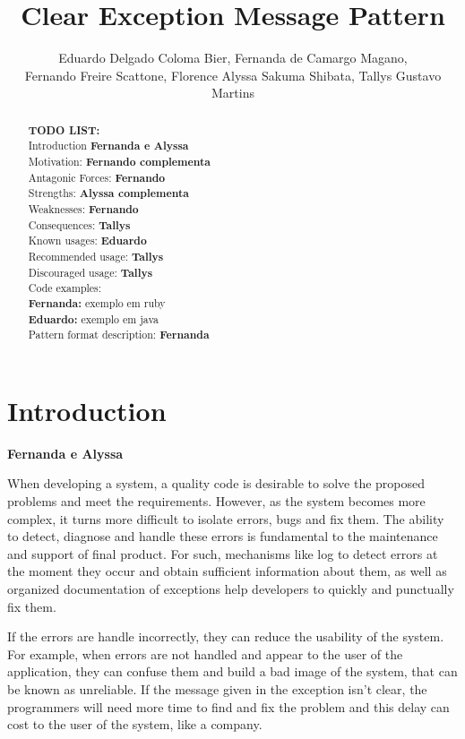\documentclass[12pt]{article}
\title{Clear Exception Message Pattern}
\author{Eduardo Delgado Coloma Bier\inst{1}, Fernanda de Camargo Magano\inst{1}, \\ Fernando Freire Scattone\inst{1},
  Florence Alyssa Sakuma Shibata\inst{1}, Tallys Gustavo Martins\inst{1} }
\begin{document}
 

\maketitle

\begin{abstract}

\textbf{TODO LIST:} \\
Introduction  \textbf{Fernanda e Alyssa} \\
Motivation: \textbf{Fernando complementa} \\
Antagonic Forces:  \textbf{Fernando}  \\
Strengths:  \textbf{Alyssa complementa} \\
Weaknesses: \textbf{Fernando} \\
Consequences: \textbf{Tallys} \\
Known usages: \textbf{Eduardo}  \\
Recommended usage: \textbf{Tallys}  \\
Discouraged usage: \textbf{Tallys} \\

Code examples: \\
\textbf{ Fernanda:} exemplo em ruby \\
\textbf{ Eduardo:} exemplo em java \\
 

Pattern format description: \textbf{Fernanda}
  
  
\end{abstract}
        

\section{Introduction}  \textbf{Fernanda e Alyssa}

When developing a system, a quality code is desirable to solve the proposed problems and meet the requirements. However, as the system becomes more complex, it turns more difficult to isolate errors, bugs and fix them. The ability to detect, diagnose and handle these errors is fundamental to the maintenance and support of final product. For such, mechanisms like log to detect errors at the moment they occur and obtain sufficient information about them, as well as  organized documentation of exceptions help developers to quickly and punctually fix them.

If the errors are handle incorrectly, they can reduce the usability of the system. For example, when errors are not handled and appear to the user of the application, they can confuse them and build a bad image of the system, that can be known as unreliable. If the message given in the exception isn't clear, the programmers will need more time to find and fix the problem and this delay can cost to the user of the system, like a company.
\end{document}
